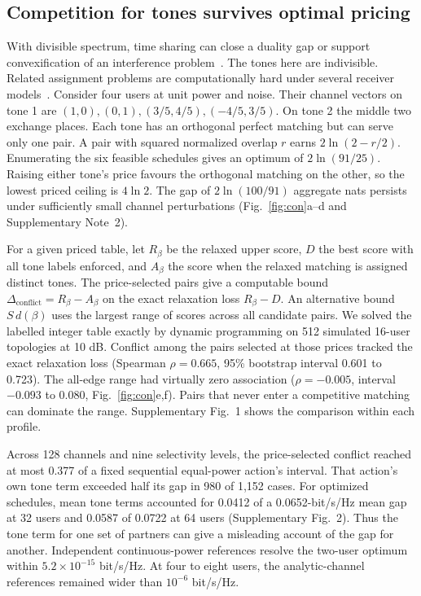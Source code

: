 \documentclass[11pt,letterpaper]{article}
\newcommand{\dc}{\Delta_{\mathrm{conflict}}}
\begin{document}
\subsection*{Competition for tones survives optimal pricing}

With divisible spectrum, time sharing can close a duality gap or support convexification of an interference problem~\cite{yului,zhaopottie}. The tones here are indivisible. Related assignment problems are computationally hard under several receiver models~\cite{dyer,razaviyayn,salaun}. Consider four users at unit power and noise. Their channel vectors on tone 1 are \((1,0),(0,1),(3/5,4/5),(-4/5,3/5)\). On tone 2 the middle two exchange places. Each tone has an orthogonal perfect matching but can serve only one pair. A pair with squared normalized overlap \(r\) earns \(2\ln(2-r/2)\). Enumerating the six feasible schedules gives an optimum of \(2\ln(91/25)\). Raising either tone's price favours the orthogonal matching on the other, so the lowest priced ceiling is \(4\ln2\). The gap of \(2\ln(100/91)\) aggregate nats persists under sufficiently small channel perturbations (Fig.~\ref{fig:con}a--d and Supplementary Note~2).


For a given priced table, let \(R_\beta\) be the relaxed upper score, \(D\) the best score with all tone labels enforced, and \(A_\beta\) the score when the relaxed matching is assigned distinct tones. The price-selected pairs give a computable bound \(\dc=R_\beta-A_\beta\) on the exact relaxation loss \(R_\beta-D\). An alternative bound \(S\,d(\beta)\) uses the largest range of scores across all candidate pairs. We solved the labelled integer table exactly by dynamic programming on 512 simulated 16-user topologies at 10 dB. Conflict among the pairs selected at those prices tracked the exact relaxation loss (Spearman \(\rho=0.665\), 95\% bootstrap interval 0.601 to 0.723). The all-edge range had virtually zero association (\(\rho=-0.005\), interval \(-0.093\) to \(0.080\), Fig.~\ref{fig:con}e,f). Pairs that never enter a competitive matching can dominate the range. Supplementary Fig.~1 shows the comparison within each profile.


Across 128 channels and nine selectivity levels, the price-selected conflict reached at most 0.377 of a fixed sequential equal-power action's interval. That action's own tone term exceeded half its gap in 980 of 1,152 cases. For optimized schedules, mean tone terms accounted for 0.0412 of a 0.0652-bit/s/Hz mean gap at 32 users and 0.0587 of 0.0722 at 64 users (Supplementary Fig.~2). Thus the tone term for one set of partners can give a misleading account of the gap for another. Independent continuous-power references resolve the two-user optimum within \(5.2\times10^{-15}\) bit/s/Hz. At four to eight users, the analytic-channel references remained wider than \(10^{-6}\) bit/s/Hz.
\end{document}
